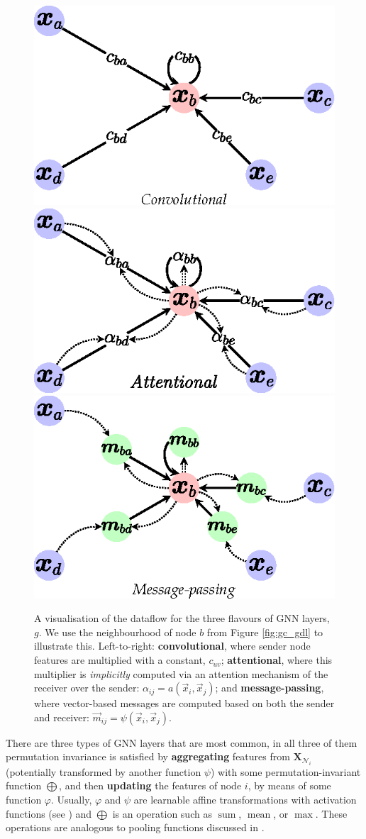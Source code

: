 \begin{figure}
    \centering
    \includegraphics[width=0.33\linewidth]{chapters/assets/graph-figs/GNN_GDL_TYPES_C.eps}
    \hspace{-0.5em}
    \includegraphics[width=0.33\linewidth]{chapters/assets/graph-figs/GNN_GDL_TYPES_A.eps}
    \hspace{-0.5em}
    \includegraphics[width=0.33\linewidth]{chapters/assets/graph-figs/GNN_GDL_TYPES_MP.eps}
    \caption{A visualisation of the dataflow for the three flavours of GNN layers, $g$. We use the neighbourhood of node $b$ from Figure \ref{fig:gc_gdl} to illustrate this. Left-to-right: \textbf{convolutional}, where sender node features are multiplied with a constant, $c_{uv}$; \textbf{attentional}, where this multiplier is \emph{implicitly} computed via an attention mechanism of the receiver over the sender: $\alpha_{ij}=a(\vec{x}_i, \vec{x}_j)$; and \textbf{message-passing}, where vector-based messages are computed based on both the sender and receiver: $\vec{m}_{ij}=\psi(\vec{x}_i, \vec{x}_j)$.}
    \label{fig:gc_flavours}
\end{figure}%

There are three types of GNN layers that are most common, in all three of them permutation invariance is satisfied by \textbf{aggregating} features from $\symbf{X}_{\mathcal{N}_i}$ (potentially transformed by another function $\psi$) with some permutation-invariant function $\bigoplus$, and then \textbf{updating} the features of node $i$, by means of some function $\varphi$. Usually, $\varphi$ and $\psi$ are learnable affine transformations with activation functions (see ) and $\bigoplus$ is an operation such as $\operatorname{sum}$, $\operatorname{mean}$, or $\operatorname{max}$. These operations are analogous to pooling functions discussed in .

